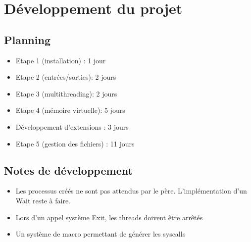 \documentclass{article}
\begin{document}
\section{Développement du projet}

\subsection{Planning}
\begin{itemize}
\item Etape 1 (installation) : 1 jour
\item Etape 2 (entrées/sorties): 2 jours
\item Etape 3 (multithreading): 2 jours
\item Etape 4 (mémoire virtuelle): 5 jours
\item Développement d'extensions : 3 jours
\item Etape 5 (gestion des fichiers) : 11 jours
\end{itemize}
\subsection{Notes de développement}

\begin{itemize}
  \item Les processus créés ne sont pas attendus par le père. L'implémentation d'un Wait reste à faire.
  \item Lors d'un appel système Exit, les threads doivent être arrêtés
  \item Un système de macro permettant de générer les syscalls
\end{itemize}
\end{document}
